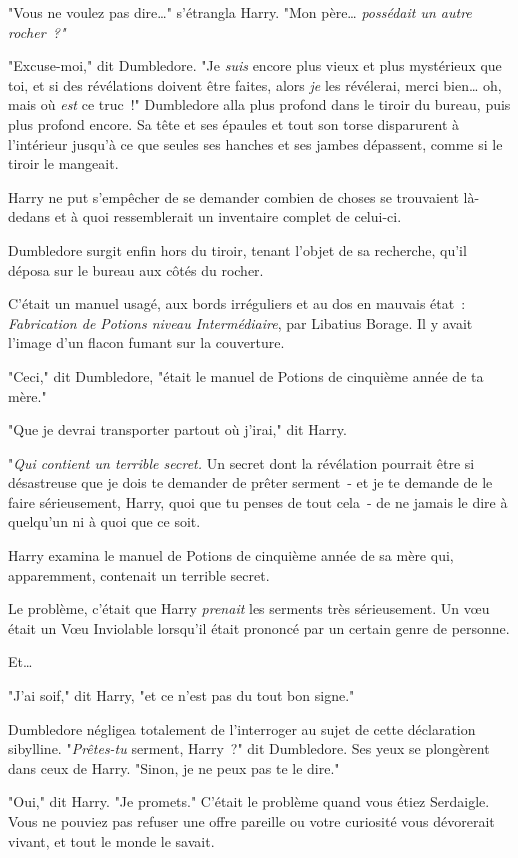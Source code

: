 "Vous ne voulez pas dire…" s'étrangla Harry. "Mon père… \emph{possédait un autre rocher~?"}

"Excuse-moi," dit Dumbledore. "Je \emph{suis} encore plus vieux et plus mystérieux que toi, et si des révélations doivent être faites, alors \emph{je} les révélerai, merci bien… oh, mais où \emph{est} ce truc~!" Dumbledore alla plus profond dans le tiroir du bureau, puis plus profond encore. Sa tête et ses épaules et tout son torse disparurent à l'intérieur jusqu'à ce que seules ses hanches et ses jambes dépassent, comme si le tiroir le mangeait.

Harry ne put s'empêcher de se demander combien de choses se trouvaient là-dedans et à quoi ressemblerait un inventaire complet de celui-ci.

Dumbledore surgit enfin hors du tiroir, tenant l'objet de sa recherche, qu'il déposa sur le bureau aux côtés du rocher.

C'était un manuel usagé, aux bords irréguliers et au dos en mauvais état~: \emph{Fabrication de Potions niveau Intermédiaire}, par Libatius Borage. Il y avait l'image d'un flacon fumant sur la couverture.

"Ceci," dit Dumbledore, "était le manuel de Potions de cinquième année de ta mère."

"Que je devrai transporter partout où j'irai," dit Harry.

"\emph{Qui contient un terrible secret.} Un secret dont la révélation pourrait être si désastreuse que je dois te demander de prêter serment~- et je te demande de le faire sérieusement, Harry, quoi que tu penses de tout cela~- de ne jamais le dire à quelqu'un ni à quoi que ce soit.

Harry examina le manuel de Potions de cinquième année de sa mère qui, apparemment, contenait un terrible secret.

Le problème, c'était que Harry \emph{prenait} les serments très sérieusement. Un vœu était un Vœu Inviolable lorsqu'il était prononcé par un certain genre de personne.

Et…

"J'ai soif," dit Harry, "et ce n'est pas du tout bon signe."

Dumbledore négligea totalement de l'interroger au sujet de cette déclaration sibylline. "\emph{Prêtes-tu} serment, Harry~?" dit Dumbledore. Ses yeux se plongèrent dans ceux de Harry. "Sinon, je ne peux pas te le dire."

"Oui," dit Harry. "Je promets." C'était le problème quand vous étiez Serdaigle. Vous ne pouviez pas refuser une offre pareille ou votre curiosité vous dévorerait vivant, et tout le monde le savait.

